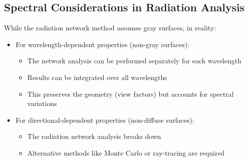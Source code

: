



\subsection*{Spectral Considerations in Radiation Analysis}

While the radiation network method assumes gray surfaces, in reality:

\begin{itemize}
    \item For wavelength-dependent properties (non-gray surfaces):
    \begin{itemize}
        \item The network analysis can be performed separately for each wavelength
        \item Results can be integrated over all wavelengths
        \item This preserves the geometry (view factors) but accounts for spectral variations
    \end{itemize}
    
    \item For directional-dependent properties (non-diffuse surfaces):
    \begin{itemize}
        \item The radiation network analysis breaks down
        \item Alternative methods like Monte Carlo or ray-tracing are required
    \end{itemize}
\end{itemize}


